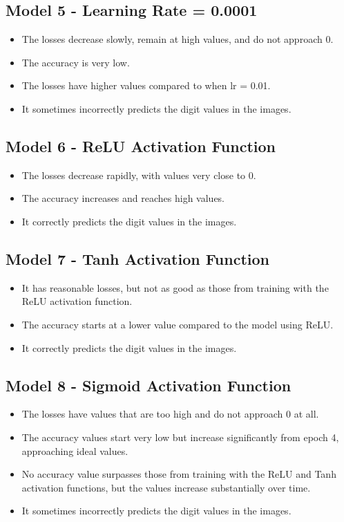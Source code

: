 \documentclass{article}
\begin{document}
\subsection*{Model 5 - Learning Rate = 0.0001}
\begin{itemize}
  \item The losses decrease slowly, remain at high values, and do not approach 0.
  \item The accuracy is very low.
  \item The losses have higher values compared to when lr = 0.01.
  \item It sometimes incorrectly predicts the digit values in the images.
\end{itemize}

\subsection*{Model 6 - ReLU Activation Function}
\begin{itemize}
  \item The losses decrease rapidly, with values very close to 0.
  \item The accuracy increases and reaches high values.
  \item It correctly predicts the digit values in the images.
\end{itemize}

\subsection*{Model 7 - Tanh Activation Function}
\begin{itemize}
  \item It has reasonable losses, but not as good as those from training with the ReLU activation function.
  \item The accuracy starts at a lower value compared to the model using ReLU.
  \item It correctly predicts the digit values in the images.
\end{itemize}

\subsection*{Model 8 - Sigmoid Activation Function}
\begin{itemize}
  \item The losses have values that are too high and do not approach 0 at all.
  \item The accuracy values start very low but increase significantly from epoch 4, approaching ideal values.
  \item No accuracy value surpasses those from training with the ReLU and Tanh activation functions, but the values increase substantially over time.
  \item It sometimes incorrectly predicts the digit values in the images.
\end{itemize}
\end{document}
